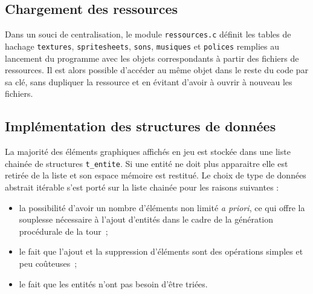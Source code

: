 \documentclass[a4paper,12pt]{article}
\begin{document}
\subsection{Chargement des ressources}

Dans un souci de centralisation, le module \texttt{ressources.c} définit les tables de hachage \texttt{textures}, \texttt{spritesheets}, \texttt{sons}, \texttt{musiques} et \texttt{polices} remplies au lancement du programme avec les objets correspondants à partir des fichiers de ressources.
Il est alors possible d’accéder au même objet dans le reste du code par sa clé, sans dupliquer la ressource et en évitant d’avoir à ouvrir à nouveau les fichiers.

\subsection{Implémentation des structures de données}

La majorité des éléments graphiques affichés en jeu est stockée dans une liste chainée de structures \texttt{t\_entite}.
Si une entité ne doit plus apparaitre elle est retirée de la liste et son espace mémoire est restitué.
Le choix de type de données abstrait itérable s’est porté sur la liste chainée pour les raisons suivantes :
\begin{itemize}
    \item la possibilité d’avoir un nombre d’éléments non limité \textit{a priori}, ce qui offre la souplesse nécessaire à l’ajout d’entités dans le cadre de la génération procédurale de la tour ;
    \item le fait que l’ajout et la suppression d’éléments sont des opérations simples et peu coûteuses ;
    \item le fait que les entités n’ont pas besoin d’être triées.
\end{itemize}
\end{document}
